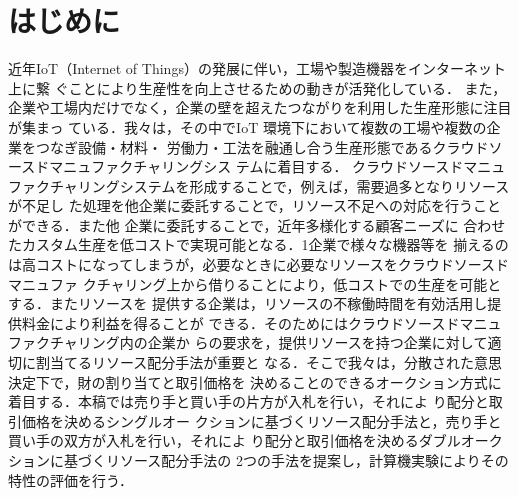 \documentclass{ujarticle}
\begin{document}
\maketitle

\section{はじめに}
近年IoT（Internet of Things）の発展に伴い，工場や製造機器をインターネット上に繋
ぐことにより生産性を向上させるための動きが活発化している．
また，企業や工場内だけでなく，企業の壁を超えたつながりを利用した生産形態に注目が集まっ
ている\cite{IVI}．我々は，その中でIoT 環境下において複数の工場や複数の企業をつなぎ設備・材料・
労働力・工法を融通し合う生産形態であるクラウドソースドマニュファクチャリングシス
テムに着目する\cite{IEC}．
クラウドソースドマニュファクチャリングシステムを形成することで，例えば，需要過多となりリソースが不足し
た処理を他企業に委託することで，リソース不足への対応を行うことができる．また他
企業に委託することで，近年多様化する顧客ニーズに
合わせたカスタム生産を低コストで実現可能となる．1企業で様々な機器等を
揃えるのは高コストになってしまうが，必要なときに必要なリソースをクラウドソースドマニュファ
クチャリング上から借りることにより，低コストでの生産を可能とする．またリソースを
提供する企業は，リソースの不稼働時間を有効活用し提供料金により利益を得ることが
できる\cite{勝村}．そのためにはクラウドソースドマニュファクチャリング内の企業か
らの要求を，提供リソースを持つ企業に対して適切に割当てるリソース配分手法が重要と
なる\cite{Wu}．そこで我々は，分散された意思決定下で，財の割り当てと取引価格を
決めることのできるオークション方式に着目する．本稿では売り手と買い手の片方が入札を行い，それによ
り配分と取引価格を決めるシングルオー
クションに基づくリソース配分手法と，売り手と買い手の双方が入札を行い，それによ
り配分と取引価格を決めるダブルオークションに基づくリソース配分手法の
2つの手法を提案し，計算機実験によりその特性の評価を行う．
\end{document}

